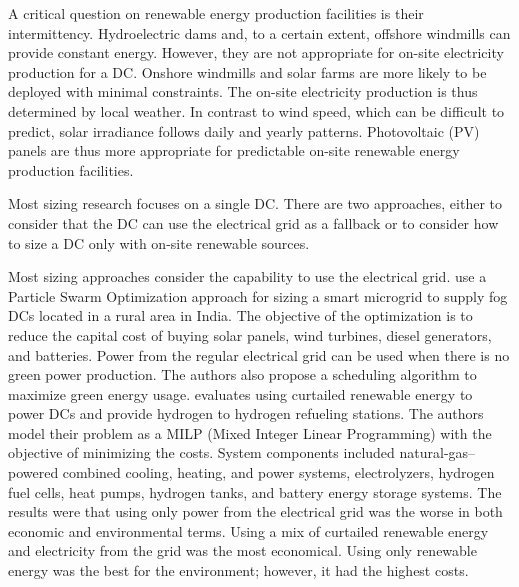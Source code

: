 A critical question on renewable energy production facilities is their
intermittency. Hydroelectric dams and, to a certain extent, offshore
windmills can provide constant energy. However, they are not
appropriate for on-site electricity production for a DC. Onshore
windmills and solar farms are more likely to be deployed with minimal
constraints. The on-site electricity production is thus determined by
local weather. In contrast to wind speed, which can be difficult to
predict, solar irradiance follows daily and yearly
patterns. Photovoltaic (PV) panels are thus more appropriate for
predictable on-site renewable energy production facilities.


Most sizing research focuses on a single DC. There are two approaches, either to consider that the DC can use the electrical grid as a fallback or to consider how to size a DC only with on-site renewable sources.

Most sizing approaches consider the capability to use the electrical grid. %
\cite{padma2021_fogdcs_rural} use a Particle Swarm Optimization approach for sizing a smart microgrid to supply fog DCs located in a rural area in India. The objective of the optimization is to reduce the capital cost of buying solar panels, wind turbines, diesel generators, and batteries. Power from the regular electrical grid can be used when there is no green power production. The authors also propose a scheduling algorithm to maximize green energy usage.
%
\citet{Niaz2022_curtailment} evaluates using curtailed renewable energy to power DCs and provide hydrogen to hydrogen refueling stations. The authors model their problem as a MILP (Mixed Integer Linear Programming) with the objective of minimizing the costs. System components included natural-gas–powered combined cooling, heating, and power systems, electrolyzers, hydrogen fuel cells, heat pumps, hydrogen tanks, and battery energy storage systems. The results were that using only power from the electrical grid was the worse in both economic and environmental terms. Using a mix of curtailed renewable energy and electricity from the grid was the most economical. Using only renewable energy was the best for the environment; however, it had the highest costs.

